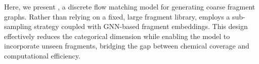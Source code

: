 

Here, we present \methodname{}, a discrete flow matching model for generating coarse fragment graphs.
Rather than relying on a fixed, large fragment library, \methodname{} employs a sub-sampling strategy coupled with GNN-based fragment embeddings.
This design effectively reduces the categorical dimension while enabling the model to incorporate unseen fragments, bridging the gap between chemical coverage and computational efficiency.

